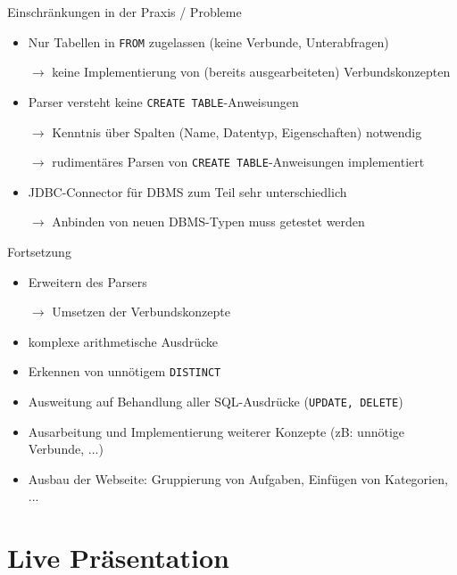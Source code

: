 \documentclass{beamer}
\begin{document}
\begin{frame}[fragile]{Einschränkungen in der Praxis / Probleme}
\begin{itemize}
\item Nur Tabellen in \verb|FROM| zugelassen (keine Verbunde, Unterabfragen)
\item[$\to$] keine Implementierung von (bereits ausgearbeiteten) Verbundskonzepten
\item Parser versteht keine \verb|CREATE TABLE|-Anweisungen
\item[$\to$] Kenntnis über Spalten (Name, Datentyp, Eigenschaften) notwendig
\item[$\to$] rudimentäres Parsen von \verb|CREATE TABLE|-Anweisungen implementiert 
\item JDBC-Connector für DBMS zum Teil sehr unterschiedlich
\item[$\to$] Anbinden von neuen DBMS-Typen muss getestet werden
\end{itemize}

\end{frame}

\begin{frame}[fragile]{Fortsetzung}
\begin{itemize}
\item Erweitern des Parsers 
\item[$\to$] Umsetzen der Verbundskonzepte
\item komplexe arithmetische Ausdrücke
\item Erkennen von unnötigem \verb|DISTINCT|
\item Ausweitung auf Behandlung aller SQL-Ausdrücke (\verb|UPDATE, DELETE|)
\item Ausarbeitung und Implementierung weiterer Konzepte (zB: unnötige Verbunde, ...)
\item Ausbau der Webseite: Gruppierung von Aufgaben, Einfügen von Kategorien, ...
\end{itemize}
\end{frame}




\section{Live Präsentation}
\end{document}

